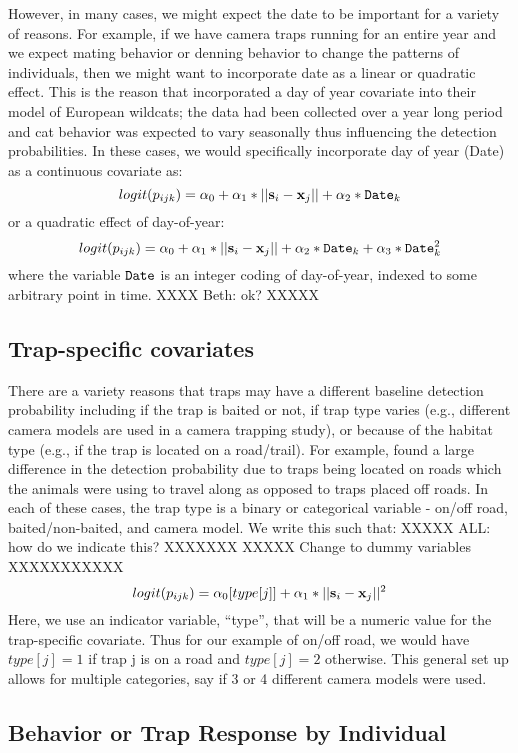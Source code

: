 However, in many cases, we might expect the date to be important for a
variety of reasons.  For example, if we have camera traps running for
an entire year and we expect mating behavior or denning behavior to
change the patterns of individuals, then we might want to incorporate
date as a linear or quadratic effect.  This is the reason that
\citet{kery_etal:2011} incorporated a day of year covariate into their
model of European wildcats; the data had been collected over a year
long period and cat behavior was expected to vary seasonally thus
influencing the detection probabilities.  In these cases, we would
specifically incorporate day of year (Date) as a continuous covariate
as:
\[
logit(p_{ijk}) = \alpha_0 + \alpha_1*||{\bf s}_{i}-{\bf x}_{j}|| + \alpha_2*\mbox{\tt Date}_{k}
\]
or a quadratic effect of day-of-year:
\[
logit(p_{ijk}) = \alpha_0 + \alpha_1*||{\bf s}_{i}-{\bf x}_{j}|| +
\alpha_2*\mbox{\tt Date}_{k}
 + \alpha_3*\mbox{\tt Date}_{k}^{2}
\]
where the variable $\mbox{\tt Date}$ is an integer coding of
day-of-year, indexed to some arbitrary point in time.  XXXX  Beth: ok? XXXXX

\subsection{Trap-specific covariates}

There are a variety reasons that traps may have a different baseline
detection probability including if the trap is baited or not, if trap
type varies (e.g., different camera models are used in a camera
trapping study), or because of the habitat type (e.g., if the trap is
located on a road/trail).  For example, \citet{sollmann_etal:2011}
found a large difference in the detection probability due to traps
being located on roads which the animals were using to travel along as
opposed to traps placed off roads.  In each of these cases, the trap
type is a binary or categorical variable - on/off road,
baited/non-baited, and camera model.  We write this such that:
XXXXX ALL: how do we indicate this? XXXXXXX
XXXXX Change to dummy variables XXXXXXXXXXX
\[
logit(p_{ijk}) = \alpha_{0}[type[j]] + \alpha_1*||{\bf s}_{i}-{\bf x}_{j}||^{2}
\]
Here, we use an indicator variable, ``type'', that will be a numeric
value for the trap-specific covariate.  Thus for our example of on/off
road, we would have $type[j] = 1$ if trap j is on a road and $type[j]
= 2$ otherwise.  This general set up allows for multiple categories,
say if 3 or 4 different camera models were used.


\subsection{Behavior or Trap Response by Individual}

